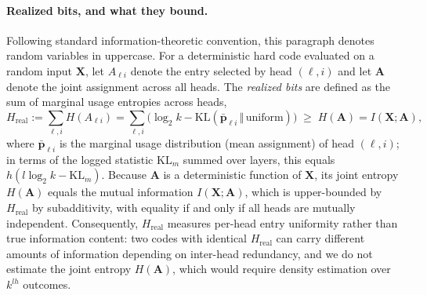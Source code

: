 \paragraph{Realized bits, and what they bound.} Following standard
information-theoretic convention, this paragraph denotes random variables
in uppercase. For a deterministic hard code evaluated on a random input
$\mathbf{X}$, let $A_{\ell i}$ denote the entry selected by head
$(\ell,i)$ and let $\mathbf{A}$ denote the joint assignment across all
heads. The \emph{realized bits} are defined as the sum of marginal usage
entropies across heads,
\begin{equation}
	H_{\mathrm{real}} := \sum_{\ell,i} H(A_{\ell i})
	= \sum_{\ell,i} \big(\log_2 k - \mathrm{KL}(\bar{\mathbf{p}}_{\ell i} \,\Vert\, \mathrm{uniform})\big)
	\;\geq\; H(\mathbf{A}) = I(\mathbf{X}; \mathbf{A}),
	\label{eq:realized}
\end{equation}
where $\bar{\mathbf{p}}_{\ell i}$ is the marginal usage distribution (mean
assignment) of head $(\ell,i)$; in terms of the logged statistic
$\mathrm{KL}_m$ summed over layers, this equals
$h(l\log_2 k - \mathrm{KL}_m)$. Because $\mathbf{A}$ is a deterministic
function of $\mathbf{X}$, its joint entropy $H(\mathbf{A})$ equals the
mutual information $I(\mathbf{X}; \mathbf{A})$, which is upper-bounded by
$H_{\mathrm{real}}$ by subadditivity, with equality if and only if all
heads are mutually independent. Consequently, $H_{\mathrm{real}}$ measures
per-head entry uniformity rather than true information content: two codes
with identical $H_{\mathrm{real}}$ can carry different amounts of
information depending on inter-head redundancy, and we do not estimate the
joint entropy $H(\mathbf{A})$, which would require density estimation over
$k^{lh}$ outcomes.

